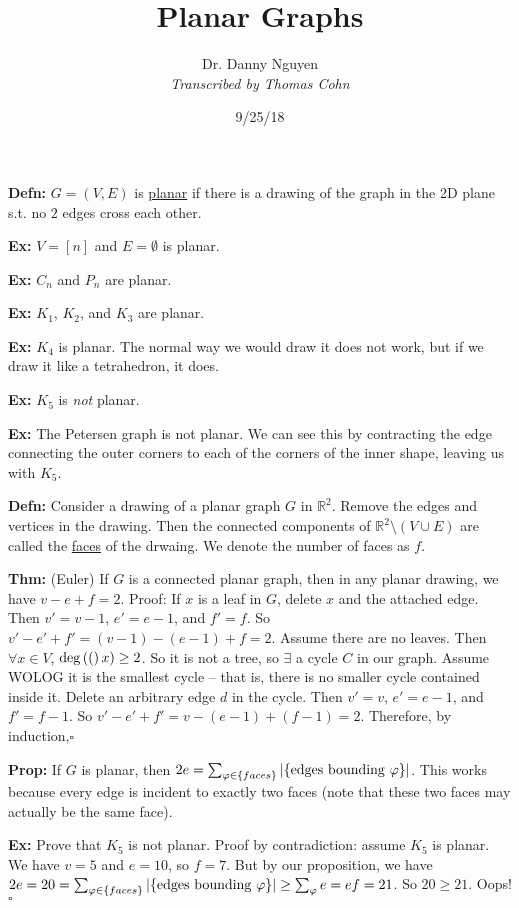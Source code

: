 \documentclass[10pt,letterpaper]{article}
\author{Dr. Danny Nguyen\\ \small\textit{Transcribed by Thomas Cohn}}
\title{Planar Graphs}
\date{9/25/18} %
\newcommand{\n}{\hfill\break}
\newcommand{\defn}[1]{\par\noindent\settowidth{\hangindent}{\textbf{Defn: }}\textbf{Defn: }#1\n}
\newcommand{\thm}[1]{\par\noindent\settowidth{\hangindent}{\textbf{Thm: }}\textbf{Thm: }#1\n}
\newcommand{\prop}[1]{\par\noindent\settowidth{\hangindent}{\textbf{Prop: }}\textbf{Prop: }#1\n}
\newcommand{\ex}[1]{\par\noindent\settowidth{\hangindent}{\textbf{Ex: }}\textbf{Ex: }#1\n}
\newcommand{\proven}{\;$\square$\n}
\newcommand{\ptxt}[1]{\textrm{\textnormal{#1}}}
\newcommand{\card}[1]{\left|#1\right|}
\newcommand{\set}[1]{\left\{#1\right\}}
\newcommand{\reals}{\mathbb{R}}
\newcommand{\R}{\reals}
\renewcommand{\deg}[1]{\ptxt{deg}\left(#1\right)}
\newcommand{\st}{s.t.}
\begin{document}
\maketitle
\setlength\RaggedRightParindent{\parindent}
\RaggedRight

\defn{$G=(V,E)$ is \underline{planar} if there is a drawing of the graph in the 2D plane \st{} no $2$ edges cross each other.}

\ex{$V=[n]$ and $E=\emptyset$ is planar.}

\ex{$C_{n}$ and $P_{n}$ are planar.}

\ex{$K_{1}$, $K_{2}$, and $K_{3}$ are planar.}

\ex{$K_{4}$ is planar. The normal way we would draw it does not work, but if we draw it like a tetrahedron, it does.}

\ex{$K_{5}$ is \textit{not} planar.}

\ex{The Petersen graph is not planar. We can see this by contracting the edge connecting the outer corners to each of the corners of the inner shape, leaving us with $K_{5}$.}

\defn{Consider a drawing of a planar graph $G$ in $\R^{2}$. Remove the edges and vertices in the drawing. Then the connected components of $\R^{2}\setminus(V\cup{}E)$ are called the \underline{faces} of the drwaing. We denote the number of faces as $f$.}

\thm{(Euler) If $G$ is a connected planar graph, then in any planar drawing, we have $v-e+f=2$.\n
Proof: If $x$ is a leaf in $G$, delete $x$ and the attached edge. Then $v'=v-1$, $e'=e-1$, and $f'=f$. So $v'-e'+f'=(v-1)-(e-1)+f=2$.\n
Assume there are no leaves. Then $\forall{}x\in{}V$, $\deg(x)\ge{}2$. So it is not a tree, so $\exists$ a cycle $C$ in our graph. Assume WOLOG it is the smallest cycle -- that is, there is no smaller cycle contained inside it. Delete an arbitrary edge $d$ in the cycle. Then $v'=v$, $e'=e-1$, and $f'=f-1$. So $v'-e'+f'=v-(e-1)+(f-1)=2$.\n
Therefore, by induction,\proven}

\prop{If $G$ is planar, then $2e=\sum_{\varphi\in\set{faces}}\card{\set{\ptxt{edges bounding }\varphi}}$. This works because every edge is incident to exactly two faces (note that these two faces may actually be the same face).}

\ex{Prove that $K_{5}$ is not planar.\n
Proof by contradiction: assume $K_{5}$ is planar. We have $v=5$ and $e=10$, so $f=7$. But by our proposition, we have $2e=20=\sum_{\varphi\in\set{faces}}\card{\set{\ptxt{edges bounding }\varphi}}\ge\sum_{\varphi}e=ef=21$. So $20\ge{}21$. Oops!\proven}
\end{document}
